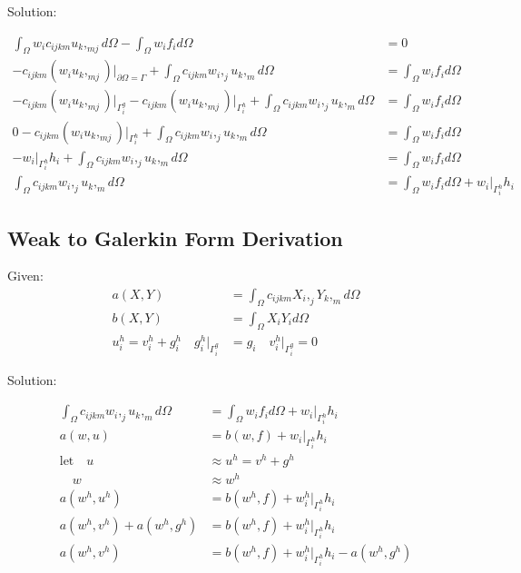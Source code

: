 \documentclass[a4paper, 12pt]{article}
\begin{document}
\noindent
Solution:

\begin{align*}
\int_{\Omega} w_{i} c_{ijkm} u_{k},_{mj} d\Omega - 
  \int_{\Omega} w_{i} f_{i} d\Omega &= 0 \\
-c_{ijkm}(w_{i} u_{k},_{mj})\Big|_{\partial\Omega = \Gamma} 
  + \int_{\Omega} c_{ijkm} w_{i},_{j} u_{k},_{m} d\Omega
  &=\int_{\Omega} w_{i} f_{i} d\Omega  \\
-c_{ijkm}(w_{i} u_{k},_{mj})\Big|_{\Gamma^{g}_{i}} 
-c_{ijkm}(w_{i} u_{k},_{mj})\Big|_{\Gamma^{h}_{i}} 
  + \int_{\Omega} c_{ijkm} w_{i},_{j} u_{k},_{m} d\Omega
  &=\int_{\Omega} w_{i} f_{i} d\Omega \\
0
 -c_{ijkm}(w_{i} u_{k},_{mj})\Big|_{\Gamma^{h}_{i}} 
  + \int_{\Omega} c_{ijkm} w_{i},_{j} u_{k},_{m} d\Omega
  &=\int_{\Omega} w_{i} f_{i} d\Omega \\
-w_{i}\Big|_{\Gamma^{h}_{i}} h_{i}
  + \int_{\Omega} c_{ijkm} w_{i},_{j} u_{k},_{m} d\Omega
  &=\int_{\Omega} w_{i} f_{i} d\Omega \\
\int_{\Omega} c_{ijkm} w_{i},_{j} u_{k},_{m} d\Omega &=
  \int_{\Omega} w_{i} f_{i} d\Omega +
  w_{i}\Big|_{\Gamma^{h}_{i}} h_{i}
\end{align*}

\newpage
\subsection{Weak to Galerkin Form Derivation} \label{sec:GalerkinDer}

Given:
\begin{align*}
a( X, Y ) &= 
  \int_{\Omega} c_{ijkm} X_{i},_{j} Y_{k},_{m} d\Omega \\
b( X, Y ) &= 
  \int_{\Omega} X_{i} Y_{i} d\Omega \\
u^{h}_{i} = 
  v^{h}_{i} + g^{h}_{i} 
  \quad
  g^{h}_{i}\Big|_{\Gamma^{g}_{i}} &= g_{i} 
  \quad 
  v^{h}_{i}\Big|_{\Gamma^{g}_{i}} = 0
\end{align*}

\noindent
Solution:

\begin{align*}
\int_{\Omega} c_{ijkm} w_{i},_{j} u_{k},_{m} d\Omega 
 &= \int_{\Omega} w_{i} f_{i} d\Omega
  + w_{i}\Big|_{\Gamma^{h}_{i}} h_{i} \\
a(w, u)
 &= b(w , f) 
  + w_{i}\Big|_{\Gamma^{h}_{i}} h_{i}  \\
\text{let} \quad u &\approx u^{h} = v^{h} + g^{h} \\
 \quad w &\approx w^{h} \\
a(w^{h} , u^{h} ) 
 &= b(w^{h}, f) 
  + w^{h}_{i}\Big|_{\Gamma^{h}_{i}} h_{i}  \\
a(w^{h} , v^{h} ) 
  + a(w^{h} , g^{h} ) 
 &= b(w^{h}, f) 
  + w^{h}_{i}\Big|_{\Gamma^{h}_{i}} h_{i}  \\
a(w^{h} , v^{h})
 &= b(w^{h} , f) 
  + w^{h}_{i}\Big|_{\Gamma^{h}_{i}} h_{i} 
  - a(w^{h} , g^{h})
\end{align*}
\end{document}
